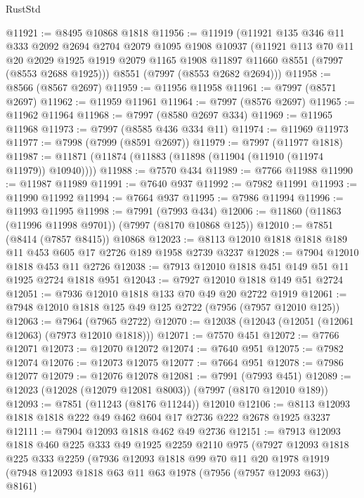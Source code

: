 \begin{lexlean}{RustStd}
\begin{coremodule}
{\begin{coremodule}
{{{{{{{{{{{{{{{{{{{{{{{{{{{{{{{{{{{{{{{{{{{@11921 := @8495 @10868 @1818
@11956 := @11919
    (@11921
      @135
      @346
      @11
      @333
      @2092
      @2694
      @2704
      @2079
      @1095
      @1908
      @10937
      (@11921
        @113
        @70
        @11
        @20
        @2029
        @1925
        @1919
        @2079
        @1165
        @1908
        @11897
        @11660
        @8551
        (@7997 (@8553 @2688 @1925)))
      @8551
      (@7997 (@8553 @2682 @2694)))
@11958 := @8566 (@8567 @2697)
@11959 := @11956 @11958
@11961 := @7997 (@8571 @2697)
@11962 := @11959 @11961
@11964 := @7997 (@8576 @2697)
@11965 := @11962 @11964
@11968 := @7997 (@8580 @2697 @334)
@11969 := @11965 @11968
@11973 := @7997 (@8585 @436 @334 @11)
@11974 := @11969 @11973
@11977 := @7998 (@7999 (@8591 @2697))
@11979 := @7997 (@11977 @1818)
@11987 := @11871 (@11874 (@11883 (@11898 (@11904 (@11910 (@11974 @11979)) @10940))))
@11988 := @7570 @434
@11989 := @7766 @11988
@11990 := @11987 @11989
@11991 := @7640 @937
@11992 := @7982 @11991
@11993 := @11990 @11992
@11994 := @7664 @937
@11995 := @7986 @11994
@11996 := @11993 @11995
@11998 := @7991 (@7993 @434)
@12006 := @11860 (@11863 (@11996 @11998 @9701)) (@7997 (@8170 @10868 @125))
@12010 := @7851 (@8414 (@7857 @8415)) @10868
@12023 := @8113 @12010 @1818 @1818 @189 @11 @453 @605 @17 @2726 @189 @1958 @2739 @3237
@12028 := @7904 @12010 @1818 @453 @11 @2726
@12038 := @7913 @12010 @1818 @451 @149 @51 @11 @1925 @2724 @1818 @951
@12043 := @7927 @12010 @1818 @149 @51 @2724
@12051 := @7936 @12010 @1818 @133 @70 @49 @20 @2722 @1919
@12061 := @7948 @12010 @1818 @125 @49 @125 @2722 (@7956 (@7957 @12010 @125))
@12063 := @7964 (@7965 @2722)
@12070 := @12038 (@12043 (@12051 (@12061 @12063) (@7973 @12010 @1818)))
@12071 := @7570 @451
@12072 := @7766 @12071
@12073 := @12070 @12072
@12074 := @7640 @951
@12075 := @7982 @12074
@12076 := @12073 @12075
@12077 := @7664 @951
@12078 := @7986 @12077
@12079 := @12076 @12078
@12081 := @7991 (@7993 @451)
@12089 := @12023 (@12028 (@12079 @12081 @8003)) (@7997 (@8170 @12010 @189))
@12093 := @7851 (@11243 (@8176 @11244)) @12010
@12106 := @8113 @12093 @1818 @1818 @222 @49 @462 @604 @17 @2736 @222 @2678 @1925 @3237
@12111 := @7904 @12093 @1818 @462 @49 @2736
@12151 := @7913
    @12093
    @1818
    @460
    @225
    @333
    @49
    @1925
    @2259
    @2110
    @975
    (@7927
      @12093
      @1818
      @225
      @333
      @2259
      (@7936
        @12093
        @1818
        @99
        @70
        @11
        @20
        @1978
        @1919
        (@7948 @12093 @1818 @63 @11 @63 @1978 (@7956 (@7957 @12093 @63)) @8161)
}}}}}}}}}}}}}}}}}}}}}}}}}}}}}}}}}}}}}}}}}}}
\end{coremodule}}
\end{coremodule}
\end{lexlean}
